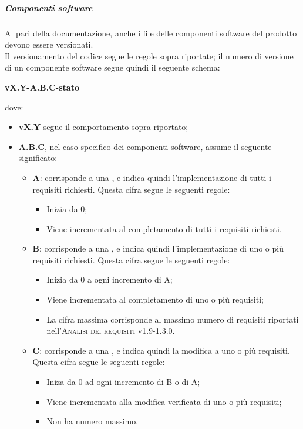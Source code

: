 \documentclass[../norme-di-progetto.tex]{subfiles}
\begin{document}
\subparagraph{Componenti software}
Al pari della documentazione, anche i file delle componenti software del prodotto devono essere versionati. \\
Il versionamento del codice segue le regole sopra riportate; il numero di versione di un componente software segue quindi il seguente schema:
\begin{center}
  \centering
  \textbf{vX.Y-A.B.C-stato}
\end{center} dove:
\begin{itemize}
  \item \textbf{vX.Y} segue il comportamento sopra riportato;
  \item \textbf{A.B.C}, nel caso specifico dei componenti software, assume il seguente significato:
  \begin{itemize}
    \item \textbf{A}: corrisponde a una , e indica quindi l'implementazione di tutti i requisiti richiesti. Questa cifra segue le seguenti regole:
    \begin{itemize}
      \item Inizia da 0;
      \item Viene incrementata al completamento di tutti i requisiti richiesti.
    \end{itemize}
    \item \textbf{B}: corrisponde a una , e indica quindi l'implementazione di uno o più requisiti richiesti. Questa cifra segue le seguenti regole:
    \begin{itemize}
      \item Inizia da 0 a ogni incremento di A;
      \item Viene incrementata al completamento di uno o più requisiti;
      \item La cifra massima corrisponde al massimo numero di requisiti riportati nell'\textsc{Analisi dei requisiti v1.9-1.3.0}.
    \end{itemize}
    \item \textbf{C}: corrisponde a una , e indica quindi la modifica a uno o più requisiti. Questa cifra segue le seguenti regole:
    \begin{itemize}
      \item Iniza da 0 ad ogni incremento di B o di A;
      \item Viene incrementata alla modifica verificata di uno o più requisiti;
      \item Non ha numero massimo.
    \end{itemize}

\end{itemize}
\end{itemize}
\end{document}
